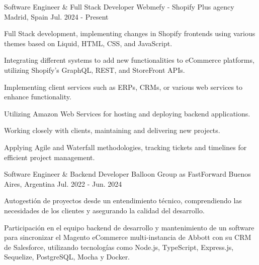 

\begin{cventries}

\vspace{3.5mm}
\cventry
    {Software Engineer \& Full Stack Developer} %
    {Webmefy - Shopify Plus agency} %
    {Madrid, Spain} %
    {Jul. 2024 - Present} %
    {
      \begin{cvitems} %
        \item {Full Stack development, implementing changes in Shopify frontends using various themes based on Liquid, HTML, CSS, and JavaScript.}
        \item {Integrating different systems to add new functionalities to eCommerce platforms, utilizing Shopify's GraphQL, REST, and StoreFront APIs.}
        \item {Implementing client services such as ERPs, CRMs, or various web services to enhance functionality.}
        \item {Utilizing Amazon Web Services for hosting and deploying backend applications.}
        \item {Working closely with clients, maintaining and delivering new projects.}
        \item {Applying Agile and Waterfall methodologies, tracking tickets and timelines for efficient project management.}
      \end{cvitems}
    }
  \vspace{5.5mm}
\cventry
    {Software Engineer \& Backend Developer} %
    {Balloon Group as FastForward} %
    {Buenos Aires, Argentina} %
    {Jul. 2022 - Jun. 2024} %
    {
      \begin{cvitems} %
        \item {Autogestión de proyectos desde un entendimiento técnico, comprendiendo las necesidades de los clientes y asegurando la calidad del desarrollo.}
        \item {Participación en el equipo backend de desarrollo y mantenimiento de un software para sincronizar el Magento eCommerce multi-instancia de Abbott con su CRM de Salesforce, utilizando tecnologías como Node.js, TypeScript, Express.js, Sequelize, PostgreSQL, Mocha y Docker.}

\end{cvitems}}
\end{cventries}
